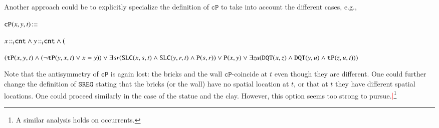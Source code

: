 \documentclass[ao]{iosart2x}
\newcommand{\nb}[1]{\textcolor{red}{$|$}\marginpar{\hspace*{-0cm}\parbox{20mm}{\scriptsize\raggedright\textcolor{red}{#1}}}}
\newcommand{\bflist}{\begin{list}{}{\setlength{\topsep}{2mm}\setlength{\parsep}{0mm}\setlength{\leftmargin}{9.2mm}\setlength{\labelwidth}{8mm}}}
\newcommand{\eflist}{\end{list}}
\newcommand{\dbThrLabel}{\textrm{t$_\texttt{db}$}}
\newcommand{\refdbth}[1]{({\dbThrLabel}\ref{#1})}
\newcommand{\pr}[1]{\mathtt{#1}}
\newcommand{\cn}[1]{\mathtt{#1}}
\newcommand\textequal{%
 \rule[.08ex]{5pt}{0.35pt}\llap{\rule[.78ex]{5pt}{0.35pt}}}
\newcommand{\sdef}{{\hspace{1.5pt}:\hspace{-2.5pt}\textequal\hspace{3pt}}}
\newcommand {\TPd} {\ensuremath{\pr{tP}}}
\newcommand {\Pd} {\ensuremath{\pr{P}}}
\newcommand {\DQTd} {\ensuremath{\pr{DQT}}}
\newcommand {\SLCd} {\ensuremath{\pr{SLC}}}
\newcommand{\cntbcat}{\cn{cnt}}
\newcommand{\bfocpart}{\pr{cP}}
\newcommand{\bfoiof}[1]{{\,::_{#1\:\!}}}
\newcommand{\bfosregof}{\pr{SREG}}
\begin{document}
Another approach could be to explicitly specialize the definition of $\bfocpart$ to take into account the different cases, e.g.,  
\bflist
\item[] $\bfocpart(x,y,t) \sdef $\parbox[t]{\textwidth} {$x \bfoiof{t} \cntbcat \land y \bfoiof{t} \cntbcat \land \\
($\parbox[t]{\textwidth} {$(\TPd(x,y,t) \land (\neg \TPd(y,x,t) \lor x=y)) \lor \\ 
\exists sr(\SLCd(x,s,t) \land \SLCd(y,r,t) \land \Pd(s,r)) \lor \\ 
\Pd(x,y) \lor \exists zu(\DQTd(x,z) \land \DQTd(y,u) \land \TPd(z,u,t)))$}}
\eflist
Note that the antisymmetry of $\bfocpart$ is again lost: the bricks and the wall $\bfocpart$-coincide at $t$ even though they are different. One could further change the definition of $\bfosregof$ stating that the bricks (or the wall) have no spatial location at $t$, or that at $t$ they have different spatial locations. One could proceed similarly in the case of the statue and the clay. However, this option seems too strong to pursue.\nb{SB: cosa significa `too strong'? bisogna dire qualcosa di più}\footnote{A similar analysis holds on occurrents.}%
\end{document}

